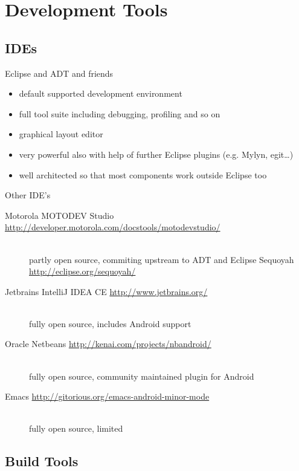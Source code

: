 \documentclass[aspectratio=169]{beamer}
\newcommand{\surl}[1] {{\tiny \url{#1}}}
\begin{document}
\section{Development Tools}

  \subsection{IDEs}

    \begin{frame}{Eclipse and ADT and friends}
        \begin{itemize}
          \item default supported development environment 
          \item full tool suite including debugging, profiling and so on
          \item graphical layout editor
          \item very powerful also with help of further Eclipse plugins (e.g. Mylyn, egit\dots)
          \item well architected so that most components work outside Eclipse too
        \end{itemize}
    \end{frame}

    \begin{frame}{Other IDE's}
      \begin{description}
        \item[Motorola MOTODEV Studio \surl{http://developer.motorola.com/docstools/motodevstudio/}] \hfill \\  partly open source, commiting upstream to ADT and Eclipse Sequoyah \surl{http://eclipse.org/sequoyah/} 
        \item[Jetbrains IntelliJ IDEA CE \surl{http://www.jetbrains.org/}] \hfill \\ fully open source, includes Android support 
        \item[Oracle Netbeans \surl{http://kenai.com/projects/nbandroid/}] \hfill \\ fully open source, community maintained plugin for Android 
        \item[Emacs \surl{http://gitorious.org/emacs-android-minor-mode}] \hfill \\ fully open source, limited
      \end{description}
    \end{frame}

  \subsection{Build Tools}
\end{document}
